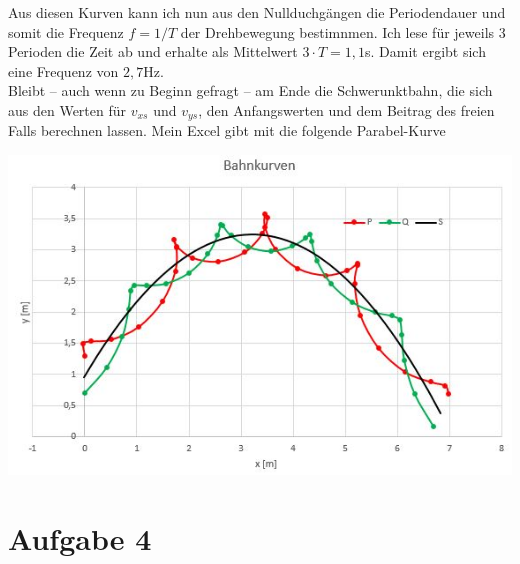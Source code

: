 \documentclass{article}
\begin{document}
Aus diesen Kurven kann ich nun aus den Nullduchgängen die Periodendauer und somit die 
Frequenz $f=1/T$ der Drehbewegung bestimnmen. Ich lese für jeweils 3 Perioden die Zeit ab und erhalte als Mittelwert $3\cdot T=1,1$s.
Damit ergibt sich eine Frequenz von $2,7$Hz.\\
Bleibt -- auch wenn zu Beginn gefragt --  am Ende die Schwerunktbahn, die sich aus den Werten für $v_{xs}$ und $v_{ys}$, den Anfangswerten und dem Beitrag des freien Falls berechnen lassen.
Mein Excel gibt mit die folgende Parabel-Kurve
\begin{center}
	\includegraphics[scale=0.8]{Schwerpunktbahn.JPG}
\end{center}


\section*{Aufgabe 4}
\end{document}
